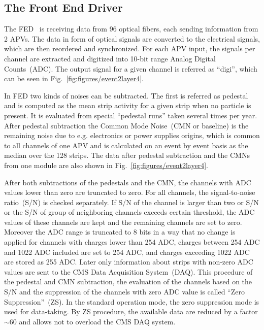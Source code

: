 
\subsection{The Front End Driver}

The FED~\cite{Baird:2002wg} is receiving data from 96 optical fibers, each sending information from 2 APVs. The data in form of optical signals are converted to the electrical signals, which are then reordered and synchronized. For each APV input, the signals per channel are extracted and digitized into 10-bit range Analog Digital Counts~(ADC). The output signal for a given channel is referred as ``digi'', which can be seen in Fig.~\ref{fig:figures/event2layer4}.

In FED two kinds of noises can be subtracted. The first is referred as pedestal and is computed as the mean strip activity for a given strip when no particle is present. It is evaluated from special ``pedestal runs'' taken several times per year. After pedestal subtraction the Common Mode Noise~(CMN or baseline) is the remaining noise due to e.g. electronics or power supplies origins, which is common to all channels of one APV and is calculated on an event by event basis as the median over the 128 strips. The data after pedestal subtraction and the CMNs from one module are also shown in Fig.~\ref{fig:figures/event2layer4}. 

After both subtractions of the pedestals and the CMN, the channels with ADC values lower than zero are truncated to zero. For all channels, the signal-to-noise ratio~(S/N) is checked separately. If S/N of the channel is larger than two or S/N or the S/N of group of neighboring channels exceeds certain threshold, the ADC values of these channels are kept and the remaining channels are set to zero. Moreover the ADC range is truncated to 8 bits in a way that no change is applied for channels with charges lower than 254 ADC, charges between 254 ADC and 1022 ADC included are set to 254 ADC, and charges exceeding 1022 ADC are stored as 255 ADC. Later only information about strips with non-zero ADC values are sent to the CMS Data Acquisition System~(DAQ).  This procedure of the pedestal and CMN subtraction, the evaluation of the channels based on the S/N and the suppression of the channels with zero ADC value is called ``Zero Suppression''~(ZS). In the standard operation mode, the zero suppression mode is used for data-taking. By ZS procedure, the available data are reduced by a factor $\sim$60 and allows not to overload the CMS DAQ system.

